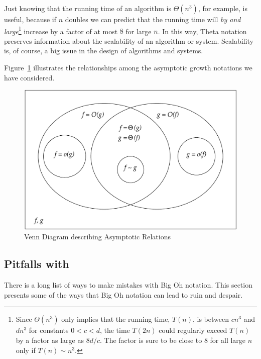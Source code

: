 Just knowing that the running time of an algorithm is $\varTheta(n^3)$, for
example, is useful, because if $n$ doubles we can predict that the running
time will \emph{by and large}\footnote{Since $\varTheta(n^3)$ only implies
that the running time, $T(n)$, is between $cn^3$ and $dn^3$ for constants
$0<c<d$, the time $T(2n)$ could regularly exceed $T(n)$ by a factor as large
as $8d/c$.  The factor is sure to be close to 8 for all large $n$ only if
$T(n) \sim n^3$.} increase by a factor of at most $8$ for large $n$.  In
this way, Theta notation preserves information about the scalability of an
algorithm or system.  Scalability is, of course, a big issue in the design
of algorithms and systems.

\begin{editingnotes}

Figure~\ref{asymp} illustrates the relationships among the asymptotic
growth notations we have considered.

\begin{figure}[h]
\begin{center}
\includegraphics[width=6in]{figures/asymp}
\end{center}
\caption{Venn Diagram describing Asymptotic Relations}
\label{asymp}
\end{figure}

\end{editingnotes}


\subsection{Pitfalls with }

There is a long list of ways to make mistakes with Big Oh notation.
This section presents some of the ways that Big Oh notation can lead
to ruin and despair.

